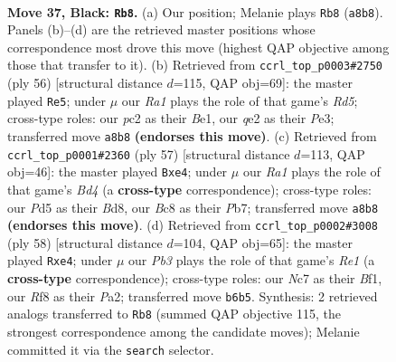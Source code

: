 \documentclass[11pt]{article}
\begin{document}
\clearpage

\begin{figure}[p]\centering
\begin{subfigure}{0.46\textwidth}\centering
\resizebox{\linewidth}{!}{%
\newchessgame
\chessboard[
  setfen={r1b2r2/p1n2p1k/1pB2Bp1/q2p4/6pP/NP6/R1PNQP2/5RK1 b - - 1 37},
  showmover=false,
  pgfstyle=straightmove, color=movearrow, markmove={a8-b8}
]}
\caption{}
\end{subfigure}\hfill
\begin{subfigure}{0.46\textwidth}\centering
\resizebox{\linewidth}{!}{%
\newchessgame
\chessboard[
  setfen={4r1k1/pp2nrp1/q7/P2R1p2/3Pn2P/R2NP2Q/5P1P/4BK2 w - - 3 29},
  showmover=false,
  pgfstyle=straightmove, color=movearrow, markmove={d5-e5}
]}
\caption{}
\end{subfigure}
\\[4pt]
\begin{subfigure}{0.46\textwidth}\centering
\resizebox{\linewidth}{!}{%
\newchessgame
\chessboard[
  setfen={r2b2k1/1prnq1p1/4p2p/1P1b4/p1NBBP2/P6P/4Q1PK/2R2R2 b - - 0 29},
  showmover=false,
  pgfstyle=straightmove, color=movearrow, markmove={d5-e4}
]}
\caption{}
\end{subfigure}\hfill
\begin{subfigure}{0.46\textwidth}\centering
\resizebox{\linewidth}{!}{%
\newchessgame
\chessboard[
  setfen={3rr1k1/6p1/pp1pp3/6q1/2P1bn1p/5P2/PPRQ2PP/4RBK1 w - - 0 30},
  showmover=false,
  pgfstyle=straightmove, color=movearrow, markmove={e1-e4}
]}
\caption{}
\end{subfigure}
\caption{\textbf{Move 37, Black: \texttt{Rb8}.} (a) Our position; Melanie plays \texttt{Rb8} (\texttt{a8b8}). Panels (b)--(d) are the retrieved master positions whose correspondence most drove this move (highest QAP objective among those that transfer to it). (b) Retrieved from \texttt{ccrl\_top\_p0003\#2750} (ply 56) [structural distance $d$=115, QAP obj=69]: the master played \texttt{Re5}; under $\mu$ our \emph{Ra1} plays the role of that game's \emph{Rd5}; cross-type roles: our \emph{p}c2 as their \emph{B}e1, our \emph{q}e2 as their \emph{P}e3; transferred move \texttt{a8b8} \textbf{(endorses this move)}. (c) Retrieved from \texttt{ccrl\_top\_p0001\#2360} (ply 57) [structural distance $d$=113, QAP obj=46]: the master played \texttt{Bxe4}; under $\mu$ our \emph{Ra1} plays the role of that game's \emph{Bd4} (a \textbf{cross-type} correspondence); cross-type roles: our \emph{P}d5 as their \emph{B}d8, our \emph{B}c8 as their \emph{P}b7; transferred move \texttt{a8b8} \textbf{(endorses this move)}. (d) Retrieved from \texttt{ccrl\_top\_p0002\#3008} (ply 58) [structural distance $d$=104, QAP obj=65]: the master played \texttt{Rxe4}; under $\mu$ our \emph{Pb3} plays the role of that game's \emph{Re1} (a \textbf{cross-type} correspondence); cross-type roles: our \emph{N}c7 as their \emph{B}f1, our \emph{R}f8 as their \emph{P}a2; transferred move \texttt{b6b5}. Synthesis: 2 retrieved analogs transferred to \texttt{Rb8} (summed QAP objective 115, the strongest correspondence among the candidate moves); Melanie committed it via the \texttt{search} selector.}
\label{fig:thought-m73}
\end{figure}
\end{document}
